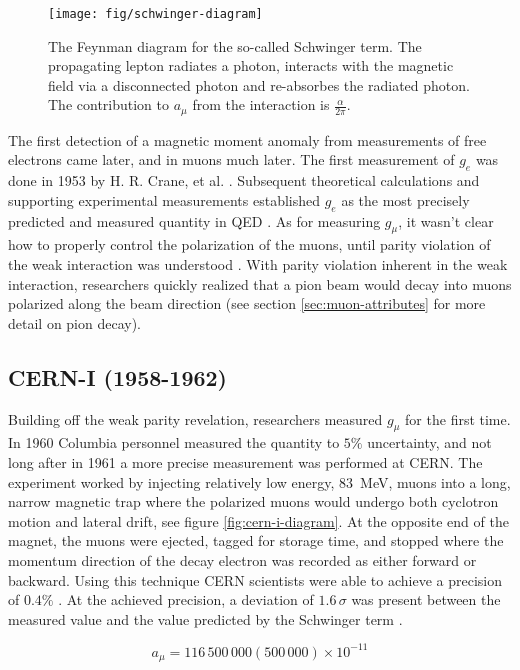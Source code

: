 \begin{figure}
\centering
\texttt{[image: fig/schwinger-diagram]}
\caption{The Feynman diagram for the so-called Schwinger term. The propagating lepton radiates a photon, interacts with the magnetic field via a disconnected photon and re-absorbes the radiated photon.  The contribution to $a_\mu$ from the interaction is $\frac{\alpha}{2\pi}$. \label{fig:schwinger-diagram}}
\end{figure}

The first detection of a magnetic moment anomaly from measurements of free electrons came later, and in muons much later.  The first measurement of $g_e$ was done in 1953 by H. R. Crane, et al. \cite{g-e-crane}.  Subsequent theoretical calculations and supporting experimental measurements established $g_e$ as the most precisely predicted and measured quantity in QED \cite{g-e-measurement}.  As for measuring $g_\mu$, it wasn't clear how to properly control the polarization of the muons, until parity violation of the weak interaction was understood \cite{lee-yang, wu-expt}.  With parity violation inherent in the weak interaction, researchers quickly realized that a pion beam would decay into muons polarized along the beam direction (see section \ref{sec:muon-attributes} for more detail on pion decay).

\subsection{CERN-I (1958-1962)}
Building off the weak parity revelation, researchers measured $g_\mu$ for the first time.  In 1960 Columbia personnel measured the quantity to $5\%$ uncertainty, and not long after in 1961 a more precise measurement was performed at CERN.  The experiment worked by injecting relatively low energy, \SI{83}{\MeV}, muons into a long, narrow magnetic trap where the polarized muons would undergo both cyclotron motion and lateral drift, see figure \ref{fig:cern-i-diagram}. At the opposite end of the magnet, the muons were ejected, tagged for storage time, and stopped where the momentum direction of the decay electron was recorded as either forward or backward.  Using this technique CERN scientists were able to achieve a precision of $0.4\%$ \cite{cern-i}.  At the achieved precision, a deviation of $1.6\,\sigma$ was present between the measured value and the value predicted by the Schwinger term \cite{47y-muon-g-2}.

\begin{equation}
\label{eqn:cern-i-results}
a_\mu = 116\,500\,000 (500\,000) \times 10^{-11}
\end{equation}

